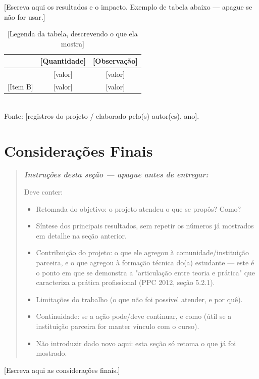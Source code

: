 \documentclass[article,12pt,a4paper]{abntex2}
\newenvironment{instrucoes}{%
  \begin{quotation}\footnotesize\itshape
  \noindent\textbf{\upshape Instruções desta seção — apague antes de entregar:}\par\smallskip
}{%
  \end{quotation}
}
\begin{document}
[Escreva aqui os resultados e o impacto. Exemplo de tabela abaixo — apague se não for usar.]

\begin{table}[!ht]
  \centering
  \caption{[Legenda da tabela, descrevendo o que ela mostra]}
  \begin{tabular}{lcc}
    \hline
    [Categoria de atendimento] & [Quantidade] & [Observação] \\
    \hline
    [Item A] & [valor] & [valor] \\{}
    [Item B] & [valor] & [valor] \\
    \hline
  \end{tabular}
  \\[0.3em]
  {\footnotesize Fonte: [registros do projeto / elaborado pelo(s) autor(es), ano].}
\end{table}

\section{Considerações Finais}

\begin{instrucoes}
Deve conter:
\begin{itemize}
  \item Retomada do objetivo: o projeto atendeu o que se propôs? Como?
  \item Síntese dos principais resultados, sem repetir os números já mostrados em detalhe na seção anterior.
  \item Contribuição do projeto: o que ele agregou à comunidade/instituição parceira, e o que agregou à formação técnica do(a) estudante — este é o ponto em que se demonstra a "articulação entre teoria e prática" que caracteriza a prática profissional (PPC 2012, seção 5.2.1).
  \item Limitações do trabalho (o que não foi possível atender, e por quê).
  \item Continuidade: se a ação pode/deve continuar, e como (útil se a instituição parceira for manter vínculo com o curso).
  \item Não introduzir dado novo aqui: esta seção só retoma o que já foi mostrado.
\end{itemize}
\end{instrucoes}

[Escreva aqui as considerações finais.]

\postextual
\end{document}

